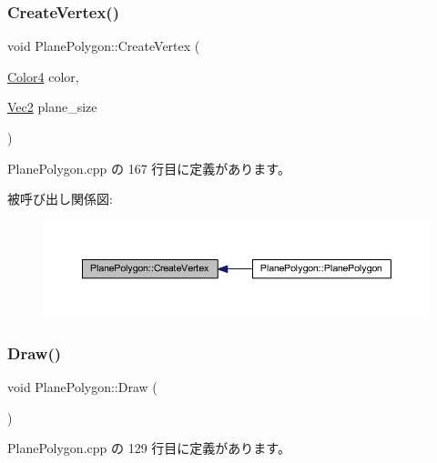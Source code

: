 \subsubsection{\texorpdfstring{Create\+Vertex()}{CreateVertex()}}
{\footnotesize\ttfamily void Plane\+Polygon\+::\+Create\+Vertex (\begin{DoxyParamCaption}\item[{\mbox{\hyperlink{_vector3_d_8h_a9c2339f516cf07ce4753b8a99fab3791}{Color4}}}]{color,  }\item[{\mbox{\hyperlink{_vector3_d_8h_a5ef6e95dfc5f9d3820b71772d99bbc25}{Vec2}}}]{plane\+\_\+size }\end{DoxyParamCaption})\hspace{0.3cm}{\ttfamily [private]}}



 Plane\+Polygon.\+cpp の 167 行目に定義があります。

被呼び出し関係図\+:\nopagebreak
\begin{figure}[H]
\begin{center}
\leavevmode
\includegraphics[width=350pt]{class_plane_polygon_aa002e213c1b0481c8b8ee56caadd270d_icgraph}
\end{center}
\end{figure}
\mbox{\label{class_plane_polygon_a2f20691ee0feee4fa428f5d017d7062a}} 
\subsubsection{\texorpdfstring{Draw()}{Draw()}}
{\footnotesize\ttfamily void Plane\+Polygon\+::\+Draw (\begin{DoxyParamCaption}{ }\end{DoxyParamCaption})}



 Plane\+Polygon.\+cpp の 129 行目に定義があります。

